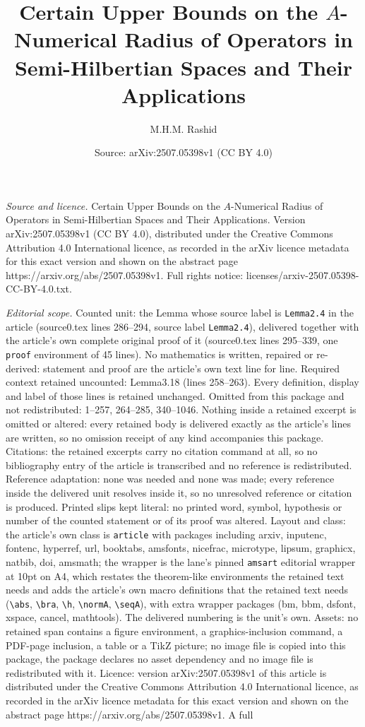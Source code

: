 \documentclass[10pt,a4paper]{amsart}
\title[Certain Upper Bounds on the $A$-Numerical Radius of Operator]{Certain Upper Bounds on the $A$-Numerical Radius of Operators in Semi-Hilbertian Spaces and Their Applications}
\author{M.H.M. Rashid}
\date{Source: arXiv:2507.05398v1 (CC BY 4.0)}
\begin{document}
\maketitle

\noindent\emph{Source and licence.} Certain Upper Bounds on the $A$-Numerical Radius of Operators in Semi-Hilbertian Spaces and Their Applications. Version arXiv:2507.05398v1 (CC BY 4.0), distributed under the Creative Commons Attribution 4.0 International licence, as recorded in the arXiv licence metadata for this exact version and shown on the abstract page https://arxiv.org/abs/2507.05398v1. Full rights notice: licenses/arxiv-2507.05398-CC-BY-4.0.txt.\par\smallskip

\noindent\textit{Editorial scope.} Counted unit: the Lemma whose source label is \texttt{Lemma2.4} in the article (source0.tex lines 286--294, source label \texttt{Lemma2.4}), delivered together with the article's own complete original proof of it (source0.tex lines 295--339, one \texttt{proof} environment of 45 lines). No mathematics is written, repaired or re-derived: statement and proof are the article's own text line for line. Required context retained uncounted: Lemma3.18 (lines 258--263). Every definition, display and label of those lines is retained unchanged. Omitted from this package and not redistributed: 1--257, 264--285, 340--1046. Nothing inside a retained excerpt is omitted or altered: every retained body is delivered exactly as the article's lines are written, so no omission receipt of any kind accompanies this package. Citations: the retained excerpts carry no citation command at all, so no bibliography entry of the article is transcribed and no reference is redistributed. Reference adaptation: none was needed and none was made; every reference inside the delivered unit resolves inside it, so no unresolved reference or citation is produced. Printed slips kept literal: no printed word, symbol, hypothesis or number of the counted statement or of its proof was altered. Layout and class: the article's own class is \texttt{article} with packages including arxiv, inputenc, fontenc, hyperref, url, booktabs, amsfonts, nicefrac, microtype, lipsum, graphicx, natbib, doi, amsmath; the wrapper is the lane's pinned \texttt{amsart} editorial wrapper at 10pt on A4, which restates the theorem-like environments the retained text needs and adds the article's own macro definitions that the retained text needs (\texttt{\textbackslash abs}, \texttt{\textbackslash bra}, \texttt{\textbackslash h}, \texttt{\textbackslash normA}, \texttt{\textbackslash seqA}), with extra wrapper packages (bm, bbm, dsfont, xspace, cancel, mathtools). The delivered numbering is the unit's own. Assets: no retained span contains a figure environment, a graphics-inclusion command, a PDF-page inclusion, a table or a TikZ picture; no image file is copied into this package, the package declares no asset dependency and no image file is redistributed with it. Licence: version arXiv:2507.05398v1 of this article is distributed under the Creative Commons Attribution 4.0 International licence, as recorded in the arXiv licence metadata for this exact version and shown on the abstract page https://arxiv.org/abs/2507.05398v1. A full 
\end{document}
